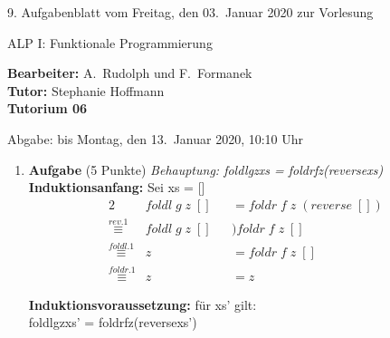 \documentclass[11pt]{article}
\newcommand{\VORLESUNG}{ALP I: Funktionale Programmierung}
\newcommand{\STAFF}{A.\ Rudolph und F.\ Formanek}
\newcommand{\ASSIGNMENT}{9}
\newcommand{\HANDOUT}{Freitag, den 03.\ Januar   2020}
\newcommand{\TUTOR}{Stephanie Hoffmann}
\newcommand{\DELIVER}{bis Montag, den 13.\ Januar 2020, 10:10 Uhr}
\newcommand{\punkte}[1]{{\small{ }(#1 Punkte)}}
\newcommand{\aufgabe}[1]{\item{\bf #1}}
\begin{document}
\begin{center}
\ASSIGNMENT{}. Aufgabenblatt vom \HANDOUT{} zur Vorlesung 
\vspace*{0.5cm}

{\Large \VORLESUNG{}}

\textbf{Bearbeiter:} \STAFF{}\\
\textbf{Tutor:} \TUTOR\\
\textbf{Tutorium 06}
\vspace*{0.5cm}

{\small Abgabe: \DELIVER{}}
\vspace*{1cm}
\end{center}
\begin{enumerate}
 \aufgabe{Aufgabe}\punkte{5}
\vspace*{0.5cm}
\textit{Behauptung: foldl\phantom{.}g\phantom{.}z\phantom{.}xs = foldr\phantom{.}f\phantom{.}z\phantom{.}(reverse\phantom{.}xs)}\\
\textbf{Induktionsanfang:} Sei xs = []
\begin{alignat*}{2}
&foldl\phantom{.}g\phantom{.}z\phantom{.}[]&&=foldr\phantom{.}f\phantom{.}z\phantom{.}(reverse\phantom{.}[])\\
\stackrel{rev.1}{\equiv}&foldl\phantom{.}g\phantom{.}z\phantom{.}[]&&)foldr\phantom{.}f\phantom{.}z\phantom{.}[]\\
\stackrel{foldl.1}{\equiv}&z &&= foldr\phantom{.}f\phantom{.}z\phantom{.}[]\\
\stackrel{foldr.1}{\equiv}&z &&= z
\end{alignat*}

\vspace*{0.5cm}
\textbf{Induktionsvoraussetzung:} für xs' gilt:\\
foldl\phantom{.}g\phantom{.}z\phantom{.}xs' = foldr\phantom{.}f\phantom{.}z\phantom{.}(reverse\phantom{.}xs')\\


\end{enumerate}
\end{document}
